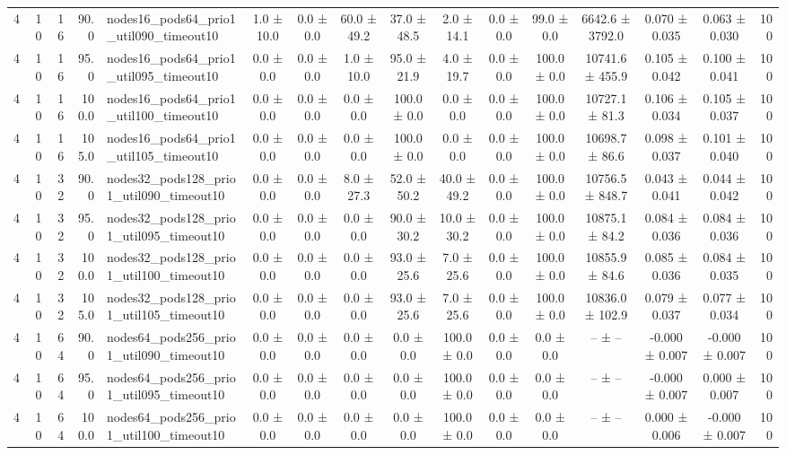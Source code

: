 \begin{tabular}{r r r r l c c c c c c c c c c r}
4 & 10 & 16 & 90.0 & nodes16\_pods64\_prio1\_util090\_timeout10 & 1.0 ± 10.0 & 0.0 ± 0.0 & 60.0 ± 49.2 & 37.0 ± 48.5 & 2.0 ± 14.1 & 0.0 ± 0.0 & 99.0 ± 0.0 & 6642.6 ± 3792.0 & 0.070 ± 0.035 & 0.063 ± 0.030 & 100 \\
4 & 10 & 16 & 95.0 & nodes16\_pods64\_prio1\_util095\_timeout10 & 0.0 ± 0.0 & 0.0 ± 0.0 & 1.0 ± 10.0 & 95.0 ± 21.9 & 4.0 ± 19.7 & 0.0 ± 0.0 & 100.0 ± 0.0 & 10741.6 ± 455.9 & 0.105 ± 0.042 & 0.100 ± 0.041 & 100 \\
4 & 10 & 16 & 100.0 & nodes16\_pods64\_prio1\_util100\_timeout10 & 0.0 ± 0.0 & 0.0 ± 0.0 & 0.0 ± 0.0 & 100.0 ± 0.0 & 0.0 ± 0.0 & 0.0 ± 0.0 & 100.0 ± 0.0 & 10727.1 ± 81.3 & 0.106 ± 0.034 & 0.105 ± 0.037 & 100 \\
4 & 10 & 16 & 105.0 & nodes16\_pods64\_prio1\_util105\_timeout10 & 0.0 ± 0.0 & 0.0 ± 0.0 & 0.0 ± 0.0 & 100.0 ± 0.0 & 0.0 ± 0.0 & 0.0 ± 0.0 & 100.0 ± 0.0 & 10698.7 ± 86.6 & 0.098 ± 0.037 & 0.101 ± 0.040 & 100 \\
4 & 10 & 32 & 90.0 & nodes32\_pods128\_prio1\_util090\_timeout10 & 0.0 ± 0.0 & 0.0 ± 0.0 & 8.0 ± 27.3 & 52.0 ± 50.2 & 40.0 ± 49.2 & 0.0 ± 0.0 & 100.0 ± 0.0 & 10756.5 ± 848.7 & 0.043 ± 0.041 & 0.044 ± 0.042 & 100 \\
4 & 10 & 32 & 95.0 & nodes32\_pods128\_prio1\_util095\_timeout10 & 0.0 ± 0.0 & 0.0 ± 0.0 & 0.0 ± 0.0 & 90.0 ± 30.2 & 10.0 ± 30.2 & 0.0 ± 0.0 & 100.0 ± 0.0 & 10875.1 ± 84.2 & 0.084 ± 0.036 & 0.084 ± 0.036 & 100 \\
4 & 10 & 32 & 100.0 & nodes32\_pods128\_prio1\_util100\_timeout10 & 0.0 ± 0.0 & 0.0 ± 0.0 & 0.0 ± 0.0 & 93.0 ± 25.6 & 7.0 ± 25.6 & 0.0 ± 0.0 & 100.0 ± 0.0 & 10855.9 ± 84.6 & 0.085 ± 0.036 & 0.084 ± 0.035 & 100 \\
4 & 10 & 32 & 105.0 & nodes32\_pods128\_prio1\_util105\_timeout10 & 0.0 ± 0.0 & 0.0 ± 0.0 & 0.0 ± 0.0 & 93.0 ± 25.6 & 7.0 ± 25.6 & 0.0 ± 0.0 & 100.0 ± 0.0 & 10836.0 ± 102.9 & 0.079 ± 0.037 & 0.077 ± 0.034 & 100 \\
4 & 10 & 64 & 90.0 & nodes64\_pods256\_prio1\_util090\_timeout10 & 0.0 ± 0.0 & 0.0 ± 0.0 & 0.0 ± 0.0 & 0.0 ± 0.0 & 100.0 ± 0.0 & 0.0 ± 0.0 & 0.0 ± 0.0 & -- ± -- & -0.000 ± 0.007 & -0.000 ± 0.007 & 100 \\
4 & 10 & 64 & 95.0 & nodes64\_pods256\_prio1\_util095\_timeout10 & 0.0 ± 0.0 & 0.0 ± 0.0 & 0.0 ± 0.0 & 0.0 ± 0.0 & 100.0 ± 0.0 & 0.0 ± 0.0 & 0.0 ± 0.0 & -- ± -- & -0.000 ± 0.007 & 0.000 ± 0.007 & 100 \\
4 & 10 & 64 & 100.0 & nodes64\_pods256\_prio1\_util100\_timeout10 & 0.0 ± 0.0 & 0.0 ± 0.0 & 0.0 ± 0.0 & 0.0 ± 0.0 & 100.0 ± 0.0 & 0.0 ± 0.0 & 0.0 ± 0.0 & -- ± -- & 0.000 ± 0.006 & -0.000 ± 0.007 & 100 \\

\end{tabular}
